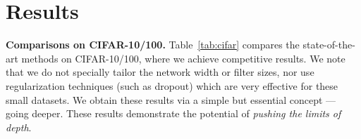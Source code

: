 \documentclass[runningheads]{llncs}
\begin{document}
\hypersetup{urlcolor=magenta}

\section{Results}

\textbf{Comparisons on CIFAR-10/100.}
Table~\ref{tab:cifar} compares the state-of-the-art methods on CIFAR-10/100, where we achieve competitive results. We note that we do not specially tailor the network width or filter sizes, nor use regularization techniques (such as dropout) which are very effective for these small datasets. We obtain these results via a simple but essential concept --- going deeper.
These results demonstrate the potential of \emph{pushing the limits of depth}.

\renewcommand\arraystretch{1.33}
\setlength{\tabcolsep}{4pt}
\end{document}
